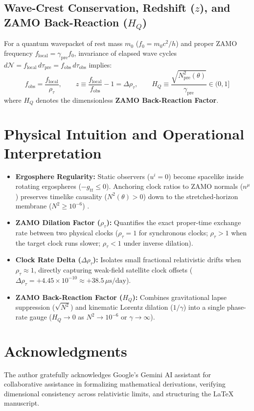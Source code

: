 \documentclass[11pt,a4paper]{article}
\begin{document}
\subsection{Wave-Crest Conservation, Redshift ($z$), and ZAMO Back-Reaction ($H_Q$)}
For a quantum wavepacket of rest mass $m_0$ ($f_0 = m_0 c^2 / h$) and proper ZAMO frequency $f_{\text{local}} = \gamma_{\text{pre}} f_0$, invariance of elapsed wave cycles $d\mathcal{N} = f_{\text{local}}\, d\tau_{\text{pre}} = f_{\text{obs}}\, d\tau_{\text{obs}}$ implies:
\begin{equation}
f_{\text{obs}} = \frac{f_{\text{local}}}{\rho_\tau}, \qquad z \equiv \frac{f_{\text{local}}}{f_{\text{obs}}} - 1 = \Delta\rho_\tau, \qquad H_Q \equiv \frac{\sqrt{N^2_{\text{pre}}(\theta)}}{\gamma_{\text{pre}}} \in (0, 1]
\end{equation}
where $H_Q$ denotes the dimensionless \textbf{ZAMO Back-Reaction Factor}.

\section{Physical Intuition and Operational Interpretation}
\begin{itemize}
    \item \textbf{Ergosphere Regularity:} Static observers ($u^i = 0$) become spacelike inside rotating ergospheres ($-g_{tt} \le 0$). Anchoring clock ratios to ZAMO normals ($n^\mu$) preserves timelike causality ($N^2(\theta) > 0$) down to the stretched-horizon membrane ($N^2 \ge 10^{-6}$) \cite{TPM1986}.
    \item \textbf{ZAMO Dilation Factor ($\rho_\tau$):} Quantifies the exact proper-time exchange rate between two physical clocks ($\rho_\tau = 1$ for synchronous clocks; $\rho_\tau > 1$ when the target clock runs slower; $\rho_\tau < 1$ under inverse dilation).
    \item \textbf{Clock Rate Delta ($\Delta\rho_\tau$):} Isolates small fractional relativistic drifts when $\rho_\tau \approx 1$, directly capturing weak-field satellite clock offsets ($\Delta\rho_\tau = +4.45 \times 10^{-10} \approx +38.5\,\mu\text{s/day}$).
    \item \textbf{ZAMO Back-Reaction Factor ($H_Q$):} Combines gravitational lapse suppression ($\sqrt{N^2}$) and kinematic Lorentz dilation ($1/\gamma$) into a single phase-rate gauge ($H_Q \to 0$ as $N^2 \to 10^{-6}$ or $\gamma \to \infty$).
\end{itemize}

\section*{Acknowledgments}
The author gratefully acknowledges Google's Gemini AI assistant for collaborative assistance in formalizing mathematical derivations, verifying dimensional consistency across relativistic limits, and structuring the \LaTeX{} manuscript.
\end{document}
